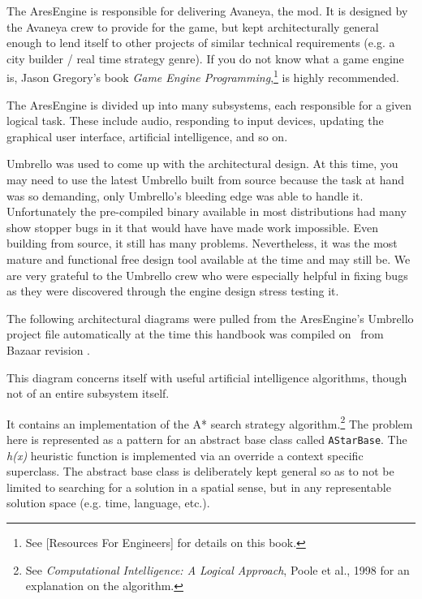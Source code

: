 

The AresEngine is responsible for delivering Avaneya, the mod. It is designed by the Avaneya crew to provide for the game, but kept architecturally general enough to lend itself to other projects of similar technical requirements (e.g. a city builder / real time strategy genre). If you do not know what a game engine is, Jason Gregory's book {\it Game Engine Programming},\footnote{See [Resources For Engineers] for details on this book.} is highly recommended.

The AresEngine is divided up into many subsystems, each responsible for a given logical task. These include audio, responding to input devices, updating the graphical user interface, artificial intelligence, and so on.

Umbrello was used to come up with the architectural design. At this time, you may need to use the latest Umbrello built from source because the task at hand was so demanding, only Umbrello's bleeding edge was able to handle it. Unfortunately the pre-compiled binary available in most distributions had many show stopper bugs in it that would have have made work impossible. Even building from source, it still has many problems. Nevertheless, it was the most mature and functional free design tool available at the time and may still be. We are very grateful to the Umbrello crew who were especially helpful in fixing bugs as they were discovered through the engine design stress testing it.

The following architectural diagrams were pulled from the AresEngine's Umbrello project file automatically at the time this handbook was compiled on \currentdate\ from Bazaar revision .

This diagram concerns itself with useful artificial intelligence algorithms, though not of an entire subsystem itself.

It contains an implementation of the A* search strategy algorithm.\footnote{See {\it Computational Intelligence: A Logical Approach}, Poole et al., 1998 for an explanation on the algorithm.} The problem here is represented as a pattern for an abstract base class called {\tt AStarBase}. The {\it h(x)} heuristic function is implemented via an override a context specific superclass. The abstract base class is deliberately kept general so as to not be limited to searching for a solution in a spatial sense, but in any representable solution space (e.g. time, language, etc.).


